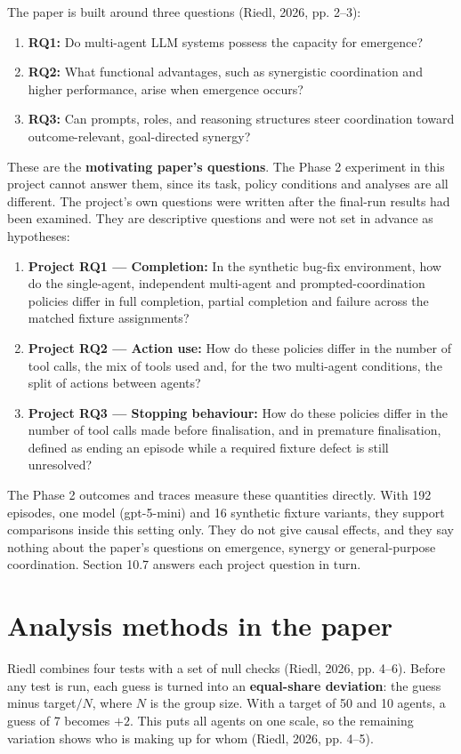 \documentclass[12pt,a4paper,oneside]{report}
\begin{document}
The paper is built around three questions (Riedl, 2026, pp. 2–3):

\begin{enumerate}
\item \textbf{RQ1:} Do multi-agent LLM systems possess the capacity for emergence?
\item \textbf{RQ2:} What functional advantages, such as synergistic coordination and higher performance, arise when emergence occurs?
\item \textbf{RQ3:} Can prompts, roles, and reasoning structures steer coordination toward outcome-relevant, goal-directed synergy?
\end{enumerate}
These are the \textbf{motivating paper’s questions}. The Phase 2 experiment in this project cannot answer them, since its task, policy conditions and analyses are all different. The project’s own questions were written after the final-run results had been examined. They are descriptive questions and were not set in advance as hypotheses:

\begin{enumerate}
\item \textbf{Project RQ1 --- Completion:} In the synthetic bug-fix environment, how do the single-agent, independent multi-agent and prompted-coordination policies differ in full completion, partial completion and failure across the matched fixture assignments?
\item \textbf{Project RQ2 --- Action use:} How do these policies differ in the number of tool calls, the mix of tools used and, for the two multi-agent conditions, the split of actions between agents?
\item \textbf{Project RQ3 --- Stopping behaviour:} How do these policies differ in the number of tool calls made before finalisation, and in premature finalisation, defined as ending an episode while a required fixture defect is still unresolved?
\end{enumerate}
The Phase 2 outcomes and traces measure these quantities directly. With 192 episodes, one model (gpt-5-mini) and 16 synthetic fixture variants, they support comparisons inside this setting only. They do not give causal effects, and they say nothing about the paper’s questions on emergence, synergy or general-purpose coordination. Section 10.7 answers each project question in turn.

\section{Analysis methods in the paper}
Riedl combines four tests with a set of null checks (Riedl, 2026, pp. 4–6). Before any test is run, each guess is turned into an \textbf{equal-share deviation}: the guess minus target\(/N\), where \(N\) is the group size. With a target of 50 and 10 agents, a guess of 7 becomes \(+2\). This puts all agents on one scale, so the remaining variation shows who is making up for whom (Riedl, 2026, pp. 4–5).
\end{document}
